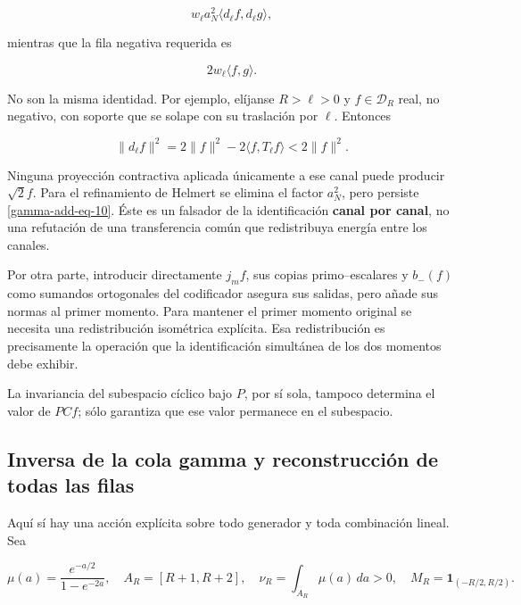 \begin{equation}
w_\ell a_N^2\langle d_\ell f,d_\ell g\rangle,
\label{gamma-add-display-22}
\end{equation}

mientras que la fila negativa requerida es

\begin{equation}
2w_\ell\langle f,g\rangle.
\label{gamma-add-display-23}
\end{equation}

No son la misma identidad. Por ejemplo, elíjanse \(R>\ell>0\) y \(f\in\mathcal D_R\) real, no negativo, con soporte que se solape con su traslación por \(\ell\). Entonces

\begin{equation}
\|d_\ell f\|^2
=2\|f\|^2-2\langle f,T_\ell f\rangle
<2\|f\|^2.
\label{gamma-add-eq-10}
\end{equation}

Ninguna proyección contractiva aplicada únicamente a ese canal puede producir \(\sqrt2f\). Para el refinamiento de Helmert se elimina el factor \(a_N^2\), pero persiste \eqref{gamma-add-eq-10}. Éste es un falsador de la identificación \textbf{canal por canal}, no una refutación de una transferencia común que redistribuya energía entre los canales.

Por otra parte, introducir directamente \(j_mf\), sus copias primo--escalares y \(b_-(f)\) como sumandos ortogonales del codificador asegura sus salidas, pero añade sus normas al primer momento. Para mantener el primer momento original se necesita una redistribución isométrica explícita. Esa redistribución es precisamente la operación que la identificación simultánea de los dos momentos debe exhibir.

La invariancia del subespacio cíclico bajo \(P\), por sí sola, tampoco determina el valor de \(PCf\); sólo garantiza que ese valor permanece en el subespacio.

\subsection{Inversa de la cola gamma y reconstrucción de todas las filas}
\label{gamma-add-sub-288}

Aquí sí hay una acción explícita sobre todo generador y toda combinación lineal. Sea

\begin{equation}
\mu(a)=\frac{e^{-a/2}}{1-e^{-2a}},\quad
A_R=[R+1,R+2],\quad \nu_R=\int_{A_R}\mu(a)\,da>0,
\quad M_R=\mathbf1_{(-R/2,R/2)}.
\label{gamma-add-display-25}
\end{equation}

